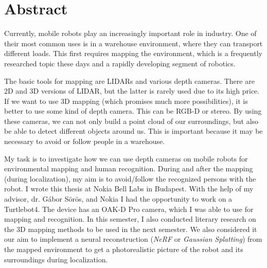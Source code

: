 \vfill
\selectenglish


\chapter*{Abstract}
Currently, mobile robots play an increasingly important role in industry. One of their most common uses is in a warehouse environment, where they can transport different loads. This first requires mapping the environment, which is a frequently researched topic these days and a rapidly developing segment of robotics.

The basic tools for mapping are LIDARs and various depth cameras. There are 2D and 3D versions of LIDAR, but the latter is rarely used due to its high price. If we want to use 3D mapping (which promises much more possibilities), it is better to use some kind of depth camera. This can be RGB-D or stereo. By using these cameras, we can not only build a point cloud of our surroundings, but also be able to detect different objects around us. This is important because it may be necessary to avoid or follow people in a warehouse.

My task is to investigate how we can use depth cameras on mobile robots for environmental mapping and human recognition. During and after the mapping (during localization), my aim is to avoid/follow the recognized persons with the robot. I wrote this thesis at Nokia Bell Labs in Budapest. With the help of my advisor, dr. Gábor Sörös, and Nokia I had the opportunity to work on a Turtlebot4. The device has an OAK-D Pro camera, which I was able to use for mapping and recognition. In this semester, I also conducted literary research on the 3D mapping methods to be used in the next semester. We also considered it our aim to implement a neural reconstruction (\textit {NeRF} or \textit{Gaussian Splatting}) from the mapped environment to get a photorealistic picture of the robot and its surroundings during localization.

\vfill
\selectthesislanguage

\setcounter{romanPage}{\value{page}}
